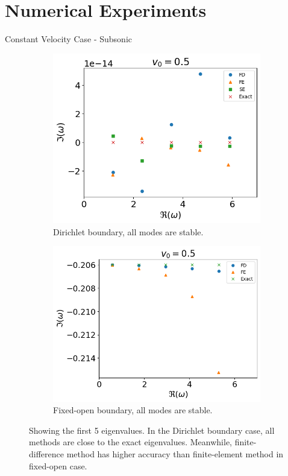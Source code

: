 \section{Numerical Experiments}
\begin{frame}{Constant Velocity Case - Subsonic}
  \begin{figure}[H]
    \centering
    \begin{subfigure}{0.45\textwidth}
      \includegraphics[width=0.9\linewidth]{../../thesis/img/numerical-experiments/fixed-fixed/constant-v-v0=0.5}
      \caption{Dirichlet boundary, all modes are stable.}
    \end{subfigure}%
    \begin{subfigure}{0.45\textwidth}
      \includegraphics[width=\linewidth]{../../thesis/img/numerical-experiments/fixed-open/constant-v-v0=0.5}
      \caption{Fixed-open boundary, all modes are stable.}
    \end{subfigure}
    \caption{Showing the first 5 eigenvalues. In the Dirichlet boundary case, all methods are close to the exact eigenvalues. Meanwhile, finite-difference method has higher accuracy than finite-element method in fixed-open case.}
  \end{figure}
\end{frame}


